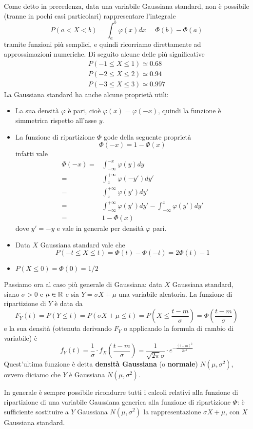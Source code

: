 Come detto in precedenza, data una variabile Gaussiana standard, non è possibile (tranne in pochi
casi particolari) rappresentare l'integrale
\[ P(a < X < b) = \int_a^b \varphi(x) dx = \Phi(b) - \Phi(a) \]
tramite funzioni più semplici, e quindi ricorriamo direttamente ad approssimazioni numeriche. Di
seguito alcune delle più significative
\begin{gather*}
	P(-1 \leq X \leq 1) \simeq 0.68 \\
	P(-2 \leq X \leq 2) \simeq 0.94 \\
	P(-3 \leq X \leq 3) \simeq 0.997
\end{gather*}
La Gaussiana standard ha anche alcune proprietà utili:
\begin{itemize}
	\item La sua densità $\varphi$ è pari, cioè $\varphi(x) = \varphi(-x)$, quindi la funzione è
	      simmetrica rispetto all'asse $y$.
	\item La funzione di ripartizione $\Phi$ gode della seguente proprietà
	      \[ \Phi(-x) = 1 - \Phi(x) \]
	      infatti vale
	      \begin{align*}
		      \Phi(-x) = & \int_{-\infty}^{-x} \varphi(y) dy           \\
		      =          & \int_x^{+\infty} \varphi(-y') dy'           \\
		      =          & \int_x^{+\infty} \varphi(y') dy'            \\
		      =          & \int_{-\infty}^{+\infty} \varphi (y') dy' -
		      \int_{-\infty}^x \varphi (y') dy'                        \\
		      =          & 1 - \Phi(x)
	      \end{align*}
	      dove $y' = -y$ e vale in generale per densità $\varphi$ pari.
	\item Data $X$ Gaussiana standard vale che
	      \[ P(-t \leq X \leq t) = \Phi (t) - \Phi (-t) = 2 \Phi (t) - 1 \]
	\item $P(X \leq 0) = \Phi (0) = 1 / 2$
\end{itemize}

Passiamo ora al caso più generale di Gaussiana: data $X$ Gaussiana standard, siano $\sigma > 0$ e
$\mu \in \mathbb{R}$ e sia $Y = \sigma X + \mu$ una variabile aleatoria. La funzione di ripartizione di
$Y$ è data da
\[
	F_Y(t) = P(Y \leq t) = P(\sigma X + \mu \leq t)
	= P\left(X \leq \frac{t-m}{\sigma}\right)
	= \Phi \left(\frac{t-m}{\sigma}\right)
\]
e la sua densità (ottenuta derivando $F_Y$ o applicando la formula di cambio di variabile) è
\[
	f_Y(t) = \frac{1}{\sigma} \cdot f_X\left(\frac{t-m}{\sigma}\right) =
	\frac{1}{\sqrt{2 \pi} \sigma} \cdot e^{-\frac{(t-m)^2}{2 \sigma^2}}
\]
Quest'ultima funzione è detta \textbf{densità Gaussiana} (o \textbf{normale}) $N(\mu, \sigma^2)$,
ovvero diciamo che $Y$ è Gaussiana $N(\mu, \sigma^2)$.

In generale è sempre possibile ricondurre tutti i calcoli relativi alla funzione di ripartizione
di una variabile Gaussiana generica alla funzione di ripartizione $\Phi$: è sufficiente sostituire
a $Y$ Gaussiana $N(\mu, \sigma^2)$ la rappresentazione $\sigma X + \mu$, con $X$ Gaussiana
standard.